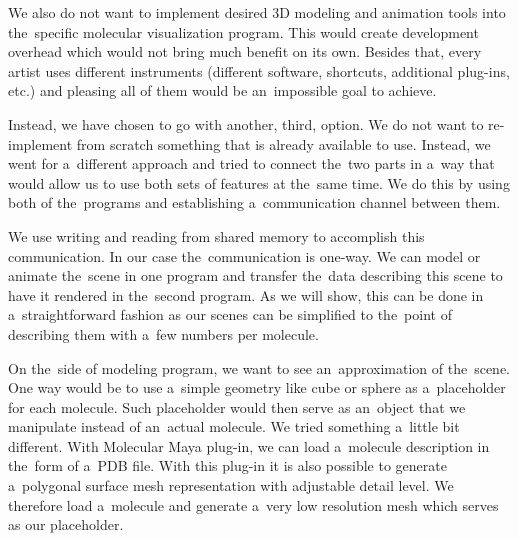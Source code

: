 \documentclass[
  digital, %
  table,   %
  nolof,     %
  nolot,     %
  oneside,
]{fithesis3}
\begin{document}
We also do not want to implement desired 3D modeling and animation tools into the specific molecular visualization program. This would create development overhead which would not bring much benefit on its own. Besides that, every artist uses different instruments (different software, shortcuts, additional plug-ins, etc.) and pleasing all of them would be an impossible goal to achieve.

Instead, we have chosen to go with another, third, option. We do not want to re-implement from scratch something that is already available to use. Instead, we went for a different approach and tried to connect the two parts in a way that would allow us to use both sets of features at the same time. We do this by using both of the programs and establishing a communication channel between them.

We use writing and reading from shared memory to accomplish this communication. In our case the communication is one-way. We can model or animate the scene in one program and transfer the data describing this scene to have it rendered in the second program. As we will show, this can be done in a straightforward fashion as our scenes can be simplified to the point of describing them with a few numbers per molecule.

On the side of modeling program, we want to see an approximation of the scene. One way would be to use a simple geometry like cube or sphere as a placeholder for each molecule. Such placeholder would then serve as an object that we manipulate instead of an actual molecule. We tried something a little bit different. With Molecular Maya plug-in, we can load a molecule description in the form of a PDB file. With this plug-in it is also possible to generate a polygonal surface mesh representation with adjustable detail level. We therefore load a molecule and generate a very low resolution mesh which serves as our placeholder.
\end{document}
